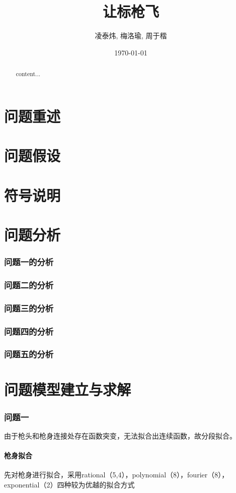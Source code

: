 \documentclass[UTF8]{ctexart}
\begin{document}
	\title{让标枪飞}
	\author{凌泰炜, 梅洛瑜, 周于楷}
	\date{\today}
	\maketitle
	\tableofcontents
	\begin{abstract}
		content...
	\end{abstract}
	\part{问题重述}
	\part{问题假设}
	\part{符号说明}
	\part{问题分析}
		\section{问题一的分析}
		\section{问题二的分析}
		\section{问题三的分析}
		\section{问题四的分析}
		\section{问题五的分析}
	\part{问题模型建立与求解}
		\section{问题一}由于枪头和枪身连接处存在函数突变，无法拟合出连续函数，故分段拟合。
			\subsection{枪身拟合}先对枪身进行拟合，采用rational（5,4），polynomial（8），fourier（8），exponential（2）四种较为优越的拟合方式\\
\end{document}
